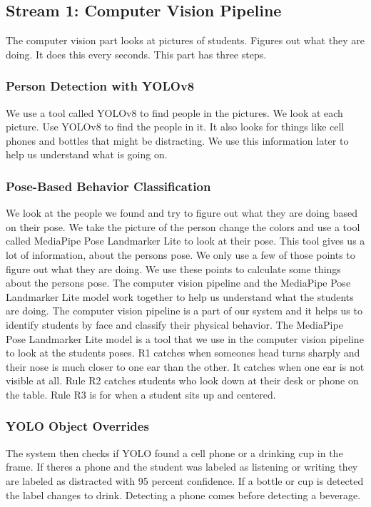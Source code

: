 \documentclass[conference]{IEEEtran}
\begin{document}
\subsection{Stream 1: Computer Vision Pipeline}
The computer vision part looks at pictures of students. Figures out what they are doing. It does this every seconds. This part has three steps.

\subsubsection{Person Detection with YOLOv8}
We use a tool called YOLOv8 to find people in the pictures. We look at each picture. Use YOLOv8 to find the people in it. It also looks for things like cell phones and bottles that might be distracting. We use this information later to help us understand what is going on.

\subsubsection{Pose-Based Behavior Classification}
We look at the people we found and try to figure out what they are doing based on their pose. We take the picture of the person change the colors and use a tool called MediaPipe Pose Landmarker Lite to look at their pose. This tool gives us a lot of information, about the persons pose. We only use a few of those points to figure out what they are doing. We use these points to calculate some things about the persons pose. The computer vision pipeline and the MediaPipe Pose Landmarker Lite model work together to help us understand what the students are doing. The computer vision pipeline is a part of our system and it helps us to identify students by face and classify their physical behavior. The MediaPipe Pose Landmarker Lite model is a tool that we use in the computer vision pipeline to look at the students poses. R1 catches when someones head turns sharply and their nose is much closer to one ear than the other. It catches when one ear is not visible at all. Rule R2 catches students who look down at their desk or phone on the table. Rule R3 is for when a student sits up and centered.

\subsubsection{YOLO Object Overrides}
The system then checks if YOLO found a cell phone or a drinking cup in the frame. If theres a phone and the student was labeled as listening or writing they are labeled as distracted with 95 percent confidence. If a bottle or cup is detected the label changes to drink. Detecting a phone comes before detecting a beverage.
\end{document}
